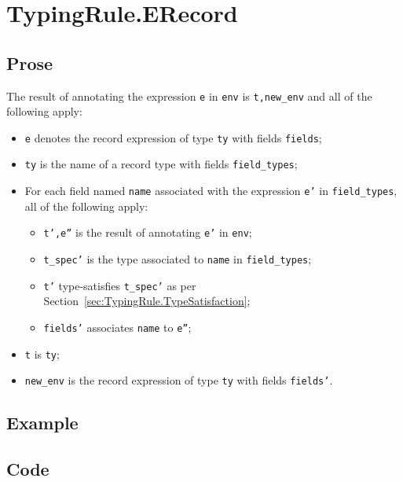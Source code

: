 \documentclass{book}
\begin{document}
\section{TypingRule.ERecord \label{sec:TypingRule.ERecord}}

  \subsection{Prose}
  The result of annotating the expression \texttt{e} in \texttt{env} is
\texttt{t,new\_env} and all of the following apply:
  \begin{itemize}
  \item \texttt{e} denotes the record expression of type \texttt{ty} with fields \texttt{fields};
  \item \texttt{ty} is the name of a record type with fields \texttt{field\_types};
  \item For each field named \texttt{name} associated with the expression \texttt{e'} in
    \texttt{field\_types}, all of the following apply:
    \begin{itemize}
    \item \texttt{t',e''} is the result of annotating \texttt{e'} in \texttt{env};
    \item \texttt{t\_spec'} is the type associated to \texttt{name} in \texttt{field\_types};
    \item \texttt{t'} type-satisfies \texttt{t\_spec'} as per Section~\ref{sec:TypingRule.TypeSatisfaction};
    \item \texttt{fields'} associates \texttt{name} to \texttt{e''};
    \end{itemize}
  \item \texttt{t} is \texttt{ty};
  \item \texttt{new\_env} is the record expression of type \texttt{ty} with fields \texttt{fields'}.
  \end{itemize}

  \subsection{Example}

  \subsection{Code}
\end{document}
